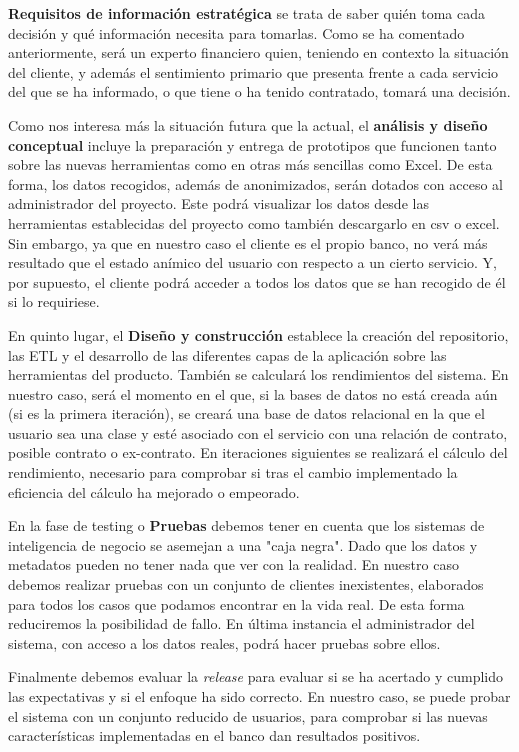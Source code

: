 \documentclass{article}
\begin{document}
\textbf{Requisitos de información estratégica} se trata de saber quién toma cada decisión y qué información necesita para tomarlas. Como se ha comentado anteriormente, será un experto financiero quien, teniendo en contexto la situación del cliente, y además el sentimiento primario que presenta frente a cada servicio del que se ha informado, o que tiene o ha tenido contratado, tomará una decisión.

Como nos interesa más la situación futura que la actual, el \textbf{análisis y diseño conceptual} incluye la preparación y entrega de prototipos que funcionen tanto sobre las nuevas herramientas como en otras más sencillas como Excel. De esta forma, los datos recogidos, además de anonimizados, serán dotados con acceso al administrador del proyecto. Este podrá visualizar los datos desde las herramientas establecidas del proyecto como también descargarlo en csv o excel. Sin embargo, ya que en nuestro caso el cliente es el propio banco, no verá más resultado que el estado anímico del usuario con respecto a un cierto servicio. Y, por supuesto, el cliente podrá acceder a todos los datos que se han recogido de él si lo requiriese.

En quinto lugar, el \textbf{Diseño y construcción} establece la creación del repositorio, las ETL y el desarrollo de las diferentes capas de la aplicación sobre las herramientas del producto. También se calculará los rendimientos del sistema. En nuestro caso, será el momento en el que, si la bases de datos no está creada aún (si es la primera iteración), se creará una base de datos relacional en la que el usuario sea una clase y esté asociado con el servicio con una relación de contrato, posible contrato o ex-contrato. En iteraciones siguientes se realizará el cálculo del rendimiento, necesario para comprobar si tras el cambio implementado la eficiencia del cálculo ha mejorado o empeorado.

En la fase de testing o \textbf{Pruebas} debemos tener en cuenta que los sistemas de inteligencia de negocio se asemejan a una "caja negra". Dado que los datos y metadatos pueden no tener nada que ver con la realidad. En nuestro caso debemos realizar pruebas con un conjunto de clientes inexistentes, elaborados para todos los casos que podamos encontrar en la vida real. De esta forma reduciremos la posibilidad de fallo. En última instancia el administrador del sistema, con acceso a los datos reales, podrá hacer pruebas sobre ellos.

Finalmente debemos evaluar la \textit{release} para evaluar si se ha acertado y cumplido las expectativas y si el enfoque ha sido correcto. En nuestro caso, se puede probar el sistema con un conjunto reducido de usuarios, para comprobar si las nuevas características implementadas en el banco dan resultados positivos.
\end{document}
